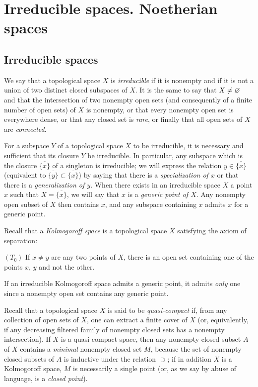 \section{Irreducible spaces. Noetherian spaces}
\label{section-irreducible-and-noetherian-spaces}

\subsection{Irreducible spaces}
\label{subsection-irreducible-spaces}

\begin{env}[2.1.1]
\label{env-0.2.1.1}
We say that a topological space $X$ is {\em irreducible} if it is nonempty and
if it is not a union of two distinct closed subspaces of $X$. It is the same to
say that $X\neq\varnothing$ and that the intersection of two nonempty open sets (and
consequently of a finite number of open sets) of $X$ is nonempty, or that every
nonempty open set is everywhere dense, or that any closed set is {\em rare}, or
finally that all open sets of $X$ are {\em connected}.
\end{env}

\begin{env}[2.1.2]
\label{env-0.2.1.2}
For a subspace $Y$ of a topological space $X$ to be irreducible, it is necessary
and sufficient that its closure $\overline{Y}$ be irreducible. In particular,
any subspace which is the closure $\overline{\{x\}}$ of a singleton is
irreducible; we will express the relation $y\in\overline{\{x\}}$ (equivalent to
$\overline{\{y\}}\subset\overline{\{x\}}$) by saying that there is a
{\em specialization of $x$} or that there is a {\em generalization of $y$}.
When there exists in an irreducible space $X$ a point $x$ such that
$X=\overline{\{x\}}$, we will say that $x$ is a {\em generic point of $X$}. Any
nonempty open subset of $X$ then contains $x$, and any subspace containing $x$
admits $x$ for a generic point.
\end{env}

\begin{env}[2.1.3]
\label{env-0.2.1.3}
Recall that a {\em Kolmogoroff space} is a topological space $X$ satisfying the
axiom of separation:

$(T_0)$ If $x\neq y$ are any two points of $X$, there is an open set containing
one of the points $x$, $y$ and not the other.

If an irreducible Kolmogoroff space admits a generic point, it admits
{\em only} one since a nonempty open set contains any generic point.

Recall that a topological space $X$ is said to be {\em quasi-compact} if, from
any collection of open sets of $X$, one can extract a finite cover of $X$ (or,
equivalently, if any decreasing filtered family of nonempty closed sets has a
nonempty intersection). If $X$ is a quasi-compact space, then any nonempty
closed subset $A$ of $X$ contains a {\em minimal} nonempty closed set $M$,
because the set of nonempty closed subsets of $A$ is inductive under the
relation $\supset$; if in addition $X$ is a Kolmogoroff space, $M$ is
necessarily a single point (or, as we say by abuse of language, is a
{\em closed point}).
\end{env}

